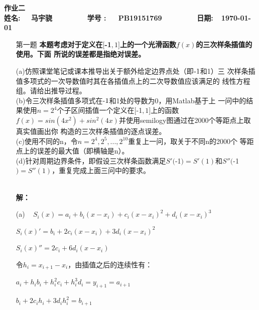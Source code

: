 \documentclass[12pt,a4paper,UTF8]{ctexart}
\begin{document}


\begin{center}
\textbf{作业二}\\
\textbf{姓名: ~~马宇骁~~~~~~~~ 学号 :~~~PB19151769~~~~~~~~ 日期:~~\today}\\
\end{center}

\begin{center}
\fbox{
\begin{minipage}{40em}
\vspace{5cm}
\hspace{20cm}
\end{minipage}}
\end{center}
\vspace{1cm}

\begin{enumerate}
\item[第一题] \textbf{本题考虑对于定义在$[$-1$,1]$上的一个光滑函数$f(x)$的三次样条插值的使用。下面
所说的误差都是指绝对误差。}

(a)仿照课堂笔记或课本推导出关于额外给定边界点处（即$\textnormal{-}1$和1）三
次样条插值多项式的一次导数值时其在各插值点上的二次导数值应该满足的
线性方程组。请给出推导过程。\\
(b)令三次样条插值多项式在$\textnormal{-}1$和1处的导数为0，用Matlab基于上
一问中的结果使用$n = 2^{4}$个子区间插值一个定义在$[$\textnormal{-}1$,1]$上的函数$f(x) =
sin(4x^{2}) + sin^{2}(4x)$并使用semilogy图通过在2000个等距点上取真实值画出你
构造的三次样条插值的逐点误差。\\
(c)使用不同的n，令$n = 2^{4}, 2^{5}, ..., 2^{10}$重复上一问，取关于不同n的2000个
等距点上的误差的最大值（即横轴是n）。\\
(d)针对周期边界条件，即假设三次样条函数满足$S'($\textnormal{-}1$) = S'(1)$和$S''($\textnormal{-}1$) =S''(1)$，重复完成上面三问中的要求。
\\~

\textbf{\LARGE 解：}

(a)
~ $S_i(x) = a_i + b_i(x - x_i) + c_i(x-x_i)^2 + d_i(x - x_i)^3$

\qquad $S_i(x)' = b_i + 2c_i(x-x_i) + 3d_i(x - x_i)^2$

\qquad $S_i(x)'' = 2c_i + 6d_i(x - x_i)$

令$h_i = x_{i+1}-x_i$，由插值之后的连续性有：

\qquad $a_i + h_i b_i + h_{i}^2 c_i + h_i^3 d_i = y_{i+1} = a_{i+1}$

\qquad $b_i + 2c_ih_i + 3d_ih_i^2 = b_{i+1}$


\end{enumerate}
\end{document}
